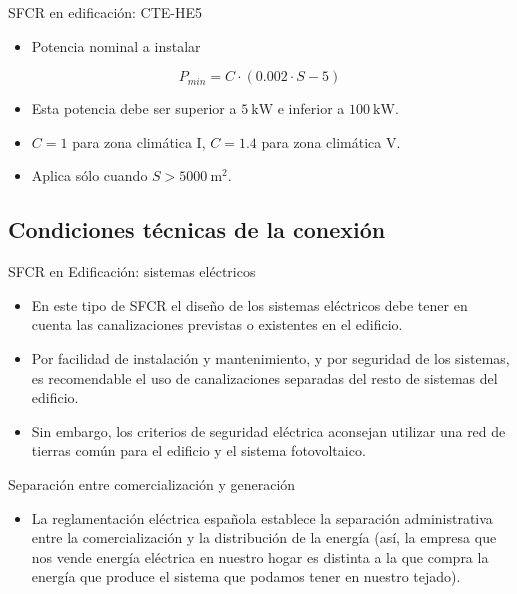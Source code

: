 \documentclass[xcolor={usenames,svgnames,dvipsnames}]{beamer}
\begin{document}
\begin{frame}[label=sec-1-3-17]{SFCR en edificación: CTE-HE5}
\begin{itemize}
\item Potencia \alert{nominal} a instalar
\end{itemize}

$$P_{min}=C\cdot(0.002\cdot S - 5)$$

\begin{itemize}
\item Esta potencia debe ser superior a $\SI{5}{\kilo\watt}$ e inferior a $\SI{100}{\kilo\watt}$.

\item $C=1$ para zona climática I, $C=1.4$ para zona climática V.

\item Aplica sólo cuando $S > \SI{5000}{\meter\squared}$.
\end{itemize}
\end{frame}

\subsection{Condiciones técnicas de la conexión}
\label{sec-1-4}

\begin{frame}[label=sec-1-4-1]{SFCR en Edificación: sistemas eléctricos}
\begin{itemize}
\item En este tipo de SFCR el diseño de los sistemas eléctricos debe tener en cuenta las canalizaciones previstas o existentes en el edificio.

\item Por facilidad de instalación y mantenimiento, y por seguridad de los sistemas, es recomendable el uso de canalizaciones separadas del resto de sistemas del edificio.

\item Sin embargo, los criterios de seguridad eléctrica aconsejan utilizar una \alert{red de tierras común} para el edificio y el sistema fotovoltaico.
\end{itemize}
\end{frame}

\begin{frame}[label=sec-1-4-2]{Separación entre comercialización y generación}
\begin{itemize}
\item La reglamentación eléctrica española establece la separación administrativa entre la comercialización y la distribución de la energía (así, la empresa que nos vende energía eléctrica en nuestro hogar es distinta a la que compra la energía que produce el sistema que podamos tener en nuestro tejado).
\end{itemize}
\end{frame}
\end{document}

